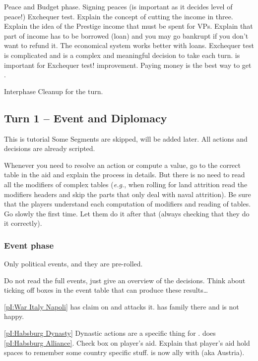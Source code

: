 \aparag Peace and Budget phase.
\bparag Signing peaces (\STAB is important as it decides level of peace!)
\bparag Exchequer test.
\bparag Explain the concept of cutting the income in three.
\bparag Explain the idea of the Prestige income that must be spent for VPs.
\bparag Explain that part of income has to be borrowed (loan) and you may go
bankrupt if you don't want to refund it.
\bparag The economical system works better with loans.
\bparag Exchequer test is complicated and is a complex and meaningful decision
to take each turn.
\bparag \STAB is important for Exchequer test!
\bparag \STAB improvement. Paying money is the best way to get \STAB.

\aparag Interphase
\bparag Cleanup for the turn.

\subsection{Turn 1 -- Event and Diplomacy}
\aparag This is tutorial
\bparag Some Segments are skipped, will be added later.
\bparag All actions and decisions are already scripted.

\aparag Whenever you need to resolve an action or compute a value, go to the
correct table in the aid and explain the process in details.
\bparag But there is no need to read all the modifiers of complex tables
(\emph{e.g.}, when rolling for land attrition read the modifiers headers and
skip the parts that only deal with naval attrition).
\bparag Be sure that the players understand each computation of modifiers and
reading of tables. Go slowly the first time. Let them do it after that (always
checking that they do it correctly).

\subsubsection{Event phase}
\aparag Only political events, and they are pre-rolled.

\aparag Do not read the full events, just give an overview of the decisions.
\bparag Think about ticking off boxes in the event table that can produce
these results\ldots

\aparag \ref{pI:War Italy Napoli}
\bparag \FRA has claim on  and attacks it. \HIS has family there
and is not happy.

\aparag \ref{pI:Habsburg Dynasty}
\bparag Dynastic actions are a specific thing for \HIS.
\bparag \HIS does \ref{pI:Habsburg Alliance}. Check box on player's
aid. Explain that player's aid hold spaces to remember some country specific
stuff.
\bparag \HIS is now ally with \paysHabsbourg (aka Austria).

